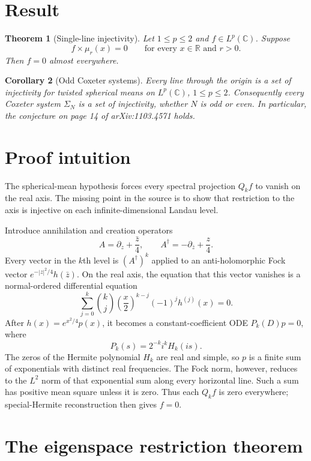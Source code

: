 \documentclass[11pt]{article}
\newtheorem{theorem}{Theorem}
\newtheorem{corollary}[theorem]{Corollary}
\newcommand{\C}{\mathbb C}
\newcommand{\R}{\mathbb R}
\newcommand{\pa}{\partial}
\newcommand{\ad}{A^{\dagger}}
\begin{document}
\section*{Result}

\begin{theorem}[Single-line injectivity]\label{thm:main}
Let $1\le p\le2$ and $f\in L^p(\C)$.  Suppose
\[
 f\times\mu_r(x)=0
 \qquad\text{for every }x\in\R\text{ and }r>0.
\]
Then $f=0$ almost everywhere.
\end{theorem}

\begin{corollary}[Odd Coxeter systems]\label{cor:coxeter}
Every line through the origin is a set of injectivity for twisted spherical
means on $L^p(\C)$, $1\le p\le2$.  Consequently every Coxeter system
$\Sigma_N$ is a set of injectivity, whether $N$ is odd or even.  In
particular, the conjecture on page 14 of arXiv:1103.4571 holds.
\end{corollary}

\section*{Proof intuition}

The spherical-mean hypothesis forces every spectral projection $Q_kf$ to
vanish on the real axis.  The missing point in the source is to show that
restriction to the axis is injective on each infinite-dimensional Landau
level.

Introduce annihilation and creation operators
\[
 A=\pa_z+\frac{\bar z}{4},
 \qquad
 \ad=-\pa_{\bar z}+\frac z4.
\]
Every vector in the $k$th level is $(\ad)^k$ applied to an
anti-holomorphic Fock vector $e^{-|z|^2/4}h(\bar z)$.  On the real axis,
the equation that this vector vanishes is a normal-ordered differential
equation
\[
 \sum_{j=0}^k\binom{k}{j}\left(\frac x2\right)^{k-j}
 (-1)^j h^{(j)}(x)=0.
\]
After $h(x)=e^{x^2/4}p(x)$, it becomes a constant-coefficient ODE
$P_k(D)p=0$, where
\[
 P_k(s)=2^{-k}i^kH_k(is).
\]
The zeros of the Hermite polynomial $H_k$ are real and simple, so $p$ is a
finite sum of exponentials with distinct real frequencies.  The Fock norm,
however, reduces to the $L^2$ norm of that exponential sum along every
horizontal line.  Such a sum has positive mean square unless it is zero.
Thus each $Q_kf$ is zero everywhere; special-Hermite reconstruction then
gives $f=0$.

\section*{The eigenspace restriction theorem}
\end{document}
